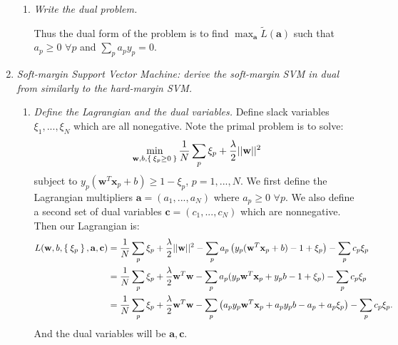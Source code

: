 \documentclass[12pt,oneside,reqno]{amsart}
\theoremstyle{plain}
\theoremstyle{definition}
\theoremstyle{remark}
\newcommand{\vecc}{\mathbf}
\newcommand{\bee}{\begin{equation}\begin{aligned}}
\newcommand{\eee}{\end{aligned}\end{equation}}
\newcommand{\fracc}{\frac}
\newcommand{\lpar}{\left(}
\newcommand{\rpar}{\right)}
\begin{document}
\begin{enumerate}[label=\arabic*.]
\begin{enumerate}
\item \textit{Write the dual problem. }


Thus the dual form of the problem is to find $\max_\vecc{a} \tilde{L}(\vecc{a})$ such that $a_p \geq 0$ $\forall p$ and $\sum_p a_py_p = 0$. 
\end{enumerate}

\item \textit{Soft-margin Support Vector Machine: derive the soft-margin SVM in dual from similarly to the hard-margin SVM. }

\begin{enumerate}
\item \textit{Define the Lagrangian and the dual variables. }
Define slack variables $\xi_1,...,\xi_N$ which are all nonegative. Note the primal problem is to solve:
\bee
\min_{\vecc{w},b,\Set{\xi_p\geq 0}}\fracc{1}{N}\sum_p\xi_p + \fracc{\lambda}{2}||\vecc{w}||^2
\eee
subject to $y_p(\vecc{w}^T\vecc{x}_p + b) \geq 1 - \xi_p$, $p = 1,...,N$. 
We first define the Lagrangian multipliers $\vecc{a} = (a_1,...,a_N)$ where $a_p \geq 0$ $\forall p$. We also define a second set of dual variables $\vecc{c} = (c_1,...,c_N)$ which are nonnegative. Then our Lagrangian is:
\bee
L(\vecc{w},b,\Set{\xi_p},\vecc{a},\vecc{c}) &= \fracc{1}{N}\sum_p\xi_p + \fracc{\lambda}{2}||\vecc{w}||^2 - \sum_p a_p\lpar y_p(\vecc{w}^T\vecc{x}_p + b) - 1 + \xi_p \rpar - \sum_p c_p\xi_p\\
&= \fracc{1}{N}\sum_p\xi_p + \fracc{\lambda}{2}\vecc{w}^T\vecc{w} - \sum_p a_p (y_p\vecc{w}^T\vecc{x}_p + y_pb - 1 + \xi_p) - \sum_p c_p\xi_p\\
&= \fracc{1}{N}\sum_p\xi_p + \fracc{\lambda}{2}\vecc{w}^T\vecc{w} - \sum_p \lpar a_py_p\vecc{w}^T\vecc{x}_p + a_py_pb - a_p + a_p\xi_p\rpar - \sum_p c_p\xi_p.
\eee
And the dual variables will be $\vecc{a},\vecc{c}$. 


\end{enumerate}
\end{enumerate}
\end{document}
